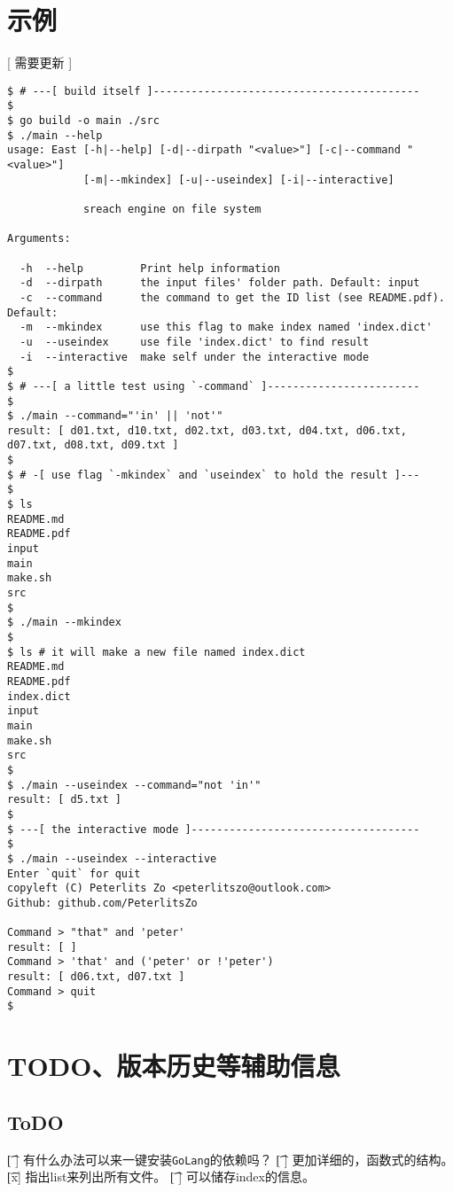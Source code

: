 \documentclass{peterlitsdoc}
\begin{document}

\section{示例}

[ 需要更新 ]

\begin{lstlisting}
$ # ---[ build itself ]------------------------------------------
$
$ go build -o main ./src
$ ./main --help
usage: East [-h|--help] [-d|--dirpath "<value>"] [-c|--command "<value>"]
            [-m|--mkindex] [-u|--useindex] [-i|--interactive]

            sreach engine on file system

Arguments:

  -h  --help         Print help information
  -d  --dirpath      the input files' folder path. Default: input
  -c  --command      the command to get the ID list (see README.pdf). Default: 
  -m  --mkindex      use this flag to make index named 'index.dict'
  -u  --useindex     use file 'index.dict' to find result
  -i  --interactive  make self under the interactive mode
$
$ # ---[ a little test using `-command` ]------------------------
$
$ ./main --command="'in' || 'not'"
result: [ d01.txt, d10.txt, d02.txt, d03.txt, d04.txt, d06.txt, d07.txt, d08.txt, d09.txt ]
$
$ # -[ use flag `-mkindex` and `useindex` to hold the result ]---
$
$ ls
README.md
README.pdf
input
main
make.sh
src
$
$ ./main --mkindex
$
$ ls # it will make a new file named index.dict
README.md
README.pdf
index.dict
input
main
make.sh
src
$
$ ./main --useindex --command="not 'in'"
result: [ d5.txt ]
$
$ ---[ the interactive mode ]------------------------------------
$
$ ./main --useindex --interactive
Enter `quit` for quit
copyleft (C) Peterlits Zo <peterlitszo@outlook.com>
Github: github.com/PeterlitsZo

Command > "that" and 'peter'
result: [ ]
Command > 'that' and ('peter' or !'peter')
result: [ d06.txt, d07.txt ]
Command > quit
$ 
\end{lstlisting}


\section{TODO、版本历史等辅助信息}

\subsection{ToDO}
\begin{plttodoenv}{1}
    \t[ ] 有什么办法可以来一键安装\verb|GoLang|的依赖吗？
    \t[ ] 更加详细的，函数式的结构。
    \t[x] 指出list来列出所有文件。
    \t[ ] 可以储存index的信息。
\end{plttodoenv}
\bigskip
\end{document}
